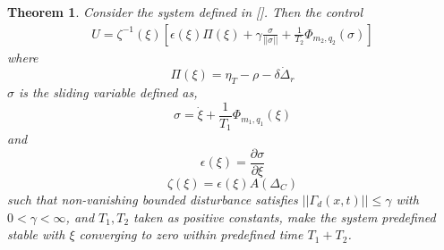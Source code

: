 \documentclass[]{article}
\newtheorem{theorem}{Theorem}
\theoremstyle{remark}
\theoremstyle{definition}
\begin{document}
\begin{theorem}
Consider the system defined in []. Then the control 
\begin{align}
	U = \zeta^{-1}(\xi)\left[\epsilon(\xi)\Pi(\xi)+ \gamma \frac{\sigma}{||\sigma||} + \frac{1}{T_2}\Phi_{m_2,q_2}(\sigma)\right]
\end{align} 
where \[\Pi(\xi) = \eta_T-\rho-\delta\dot\Delta_r\]
$\sigma$ is the sliding variable defined as,
\[\sigma  = \dot{\xi} + \frac{1}{T_1}\Phi_{m_1,q_1}(\xi)\]
and \[\epsilon(\xi)= \frac{\partial \sigma}{\partial \xi}\]
\[\zeta(\xi) = \epsilon(\xi)A(\Delta_C)\]
such that non-vanishing bounded disturbance satisfies $||\Gamma_d(x,t)||\leq \gamma$ with $ 0< \gamma < \infty$, and $ T_1, T_2 $ taken as positive constants, make the system predefined stable with $\xi$ converging to zero within predefined time $T_1+T_2$.
\end{theorem}
\end{document}
